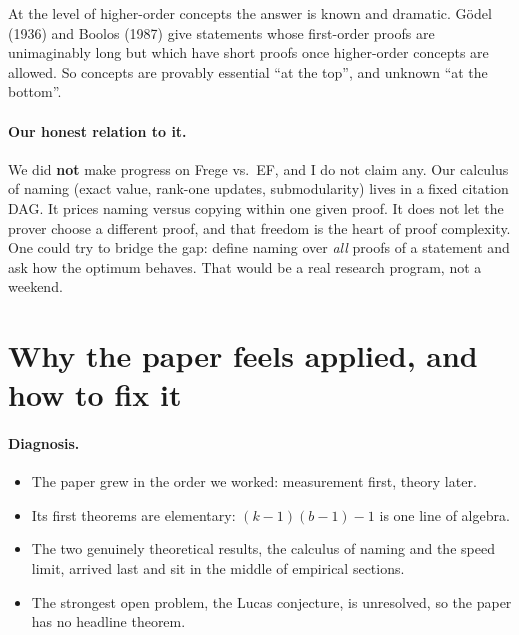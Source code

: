 \documentclass[11pt]{article}
\begin{document}
\noindent At the level of higher-order concepts the answer is known and dramatic. G\"odel
(1936) and Boolos (1987) give statements whose first-order proofs are unimaginably long
but which have short proofs once higher-order concepts are allowed. So concepts are
provably essential ``at the top'', and unknown ``at the bottom''.

\paragraph{Our honest relation to it.} We did \textbf{not} make progress on Frege vs.\
EF, and I do not claim any. Our calculus of naming (exact value, rank-one updates,
submodularity) lives in a fixed citation DAG. It prices naming versus copying within one
given proof. It does not let the prover choose a different proof, and that freedom is the
heart of proof complexity. One could try to bridge the gap: define naming over \emph{all}
proofs of a statement and ask how the optimum behaves. That would be a real research
program, not a weekend.

\section{Why the paper feels applied, and how to fix it}

\paragraph{Diagnosis.}
\begin{itemize}
\item The paper grew in the order we worked: measurement first, theory later.
\item Its first theorems are elementary: $(k-1)(b-1)-1$ is one line of algebra.
\item The two genuinely theoretical results, the calculus of naming and the speed limit,
  arrived last and sit in the middle of empirical sections.
\item The strongest open problem, the Lucas conjecture, is unresolved, so the paper has
  no headline theorem.
\end{itemize}
\end{document}

